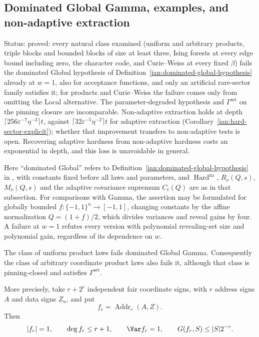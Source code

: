 \subsection{Dominated Global Gamma, examples, and non-adaptive extraction}\label{ian:dominated-gamma-examples}

Status: proved: every natural class examined (uniform and arbitrary products, triple blocks and bounded blocks of size at least three, Ising forests at every edge bound including zero, the character code, and Curie--Weiss at every fixed \(\beta\)) fails the dominated Global hypothesis of Definition~\ref{ian:dominated-global-hypothesis} already at \(w=1\), also for acceptance functions, and only an artificial rare-sector family satisfies it; for products and Curie--Weiss the failure comes only from omitting the Local alternative. The parameter-degraded hypothesis and \(\Gamma^{\mathrm{set}}\) on the pinning closure are incomparable. Non-adaptive extraction holds at depth \(\lceil256\varepsilon^{-7}\eta^{-3}\rceil t\), against \(\lceil32\varepsilon^{-5}\eta^{-2}\rceil t\) for adaptive extraction (Corollary~\ref{ian:hard-sector-explicit}); whether that improvement transfers to non-adaptive tests is open. Recovering adaptive hardness from non-adaptive hardness costs an exponential in depth, and this loss is unavoidable in general.

Here ``dominated Global'' refers to
Definition~\ref{ian:dominated-global-hypothesis} in
, with constants fixed
before all laws and parameters, and \(\operatorname{Hard}^{\mathrm{na}}\),
\(R_\nu(Q,s)\), \(M_\nu(Q,s)\) and the adaptive covariance supremum
\(C_t(Q)\) are as in that subsection. For comparisons
with Gamma, the assertion may be formulated for globally bounded
\(f:\{-1,1\}^n\to[-1,1]\), changing constants by the affine
normalization \(Q=(1+f)/2\), which divides variances and reveal gains by
four. A failure at \(w=1\) refutes every version with polynomial
revealing-set size and polynomial gain, regardless of its dependence
on \(w\).

\begin{proposition}
\label{ian:dominated-global-product-failure}
The class of uniform product laws fails dominated Global Gamma.
Consequently the class of arbitrary coordinate product laws also
fails it, although that class is pinning-closed and satisfies
\(\Gamma^{\mathrm{set}}\).

More precisely, take \(r+2^r\) independent fair coordinate signs,
with \(r\) address signs \(A\) and data signs \(Z_u\), and put
\[
 f_r=\operatorname{Addr}_r(A,Z).
\]
Then
\[
 |f_r|=1,\qquad \deg f_r\le r+1,\qquad \Var f_r=1,
 \qquad
 G(f_r,S)\le |S|2^{-r}.
\]
\end{proposition}

